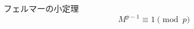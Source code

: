 \documentclass[fleqn,leqno,autodetect-engine,dvipdfmxi-if-dvi,ja=standard]{bxjsarticle}
\begin{document}
フェルマーの小定理
\begin{displaymath}
M^{p-1} \equiv 1 \pmod{p}
\end{displaymath}
\end{document}
